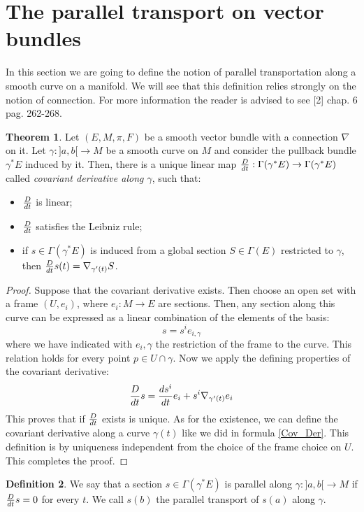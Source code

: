 \documentclass[12pt,a4paper]{report}
\theoremstyle{definition}
\newtheorem{Def}{Definition}[chapter]
\theoremstyle{Theorem}
\newtheorem{Theo}[Def]{Theorem}
\theoremstyle{definition}
\theoremstyle{definition}
\begin{document}
	\section{The parallel transport on vector bundles}
	In this section we are going to define the notion of parallel transportation along a smooth curve on a manifold. We will see that this definition relies strongly on the notion of connection. For more information the reader is advised to see [2] chap. 6 pag. 262-268.
	\begin{Theo}
		Let $(E,M,\pi,F)$ be a smooth vector bundle with a connection $\nabla$ on it. Let $\gamma:]a,b[\rightarrow M$ be a smooth curve on $M$ and consider the pullback bundle $\gamma^*E$ induced by it. Then, there is a unique linear map ${D\over dt}:\Gamma(\gamma^*E)\rightarrow \Gamma(\gamma^*E)$ called \textit{covariant derivative along $\gamma$}, such that:
		\begin{itemize}
			\item ${D\over dt}$ is linear;
			\item ${D\over dt}$ satisfies the Leibniz rule;
			\item if $s\in \Gamma(\gamma^*E)$ is induced from a global section $S\in\Gamma(E)$ restricted to $\gamma$, then ${D\over dt}s(t)=\nabla_{\gamma'(t)}S$.
		\end{itemize}
	\end{Theo}
	\begin{proof}
		Suppose that the covariant derivative exists. Then choose an open set with a frame $(U,{e_i})$, where $e_i:M\rightarrow
		E$ are sections. Then, any section along this curve can be expressed as a linear combination of the elements of the basis:
		$$s=s^ie_{i,\gamma}$$
		where we have indicated with $e_i,{\gamma}$ the restriction of the frame to the curve. This relation holds for every point $p\in U\cap\gamma$. Now we apply the defining properties of the covariant derivative:
		\begin{equation}\label{Cov_Der}
			{D\over dt}s={ds^i\over dt}e_i+s^i\nabla_{\gamma'(t)}e_i	
		\end{equation}
		This proves that if $D\over dt$ exists is unique. As for the existence, we can define the covariant derivative along a curve $\gamma(t)$ like we did in formula \ref{Cov_Der}. This definition is by uniqueness independent from the choice of the frame choice on $U$. This completes the proof.
	\end{proof}
	\begin{Def}
		We say that a section $s\in\Gamma(\gamma^*E)$ is parallel along $\gamma:]a,b[\rightarrow M$ if ${D\over dt}s=0$ for every $t$. We call $s(b)$ the parallel transport of $s(a)$ along $\gamma$.
	\end{Def}
\end{document}
